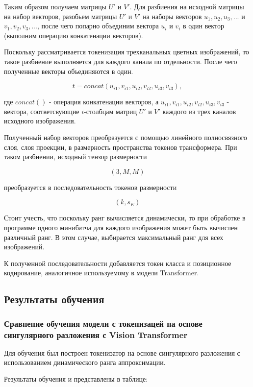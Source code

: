\documentclass[times,specification,annotation]{itmo-student-thesis}
\begin{document}
Таким образом получаем матрицы $U'$ и $V'$. Для разбиения на исходной матрицы на набор векторов, разобьем матрицы $U'$ и $V'$ на наборы векторов $u_1, u_2, u_3, ...$ и $v_1, v_2, v_3, ...$, после чего попарно объединим вектора $u_i$ и $v_i$ в один вектор (выполним операцию конкатенации векторов).

Поскольку рассматривается токенизация трехканальных цветных изображений, то такое разбиение выполняется для каждого канала по отдельности. После чего полученные векторы объединяются в один.

$$
t = concat(u_{i1}, v_{i1}, u_{i2}, v_{i2}, u_{i3}, v_{i3}),
$$

где $concat()$ - операция конкатенации векторов, а $u_{i1}, v_{i1}, u_{i2}, v_{i2}, u_{i3}, v_{i3}$ - вектора, соответсвующие $i$-столбцам матриц $U'$ и $V'$ каждого из трех каналов исходного изображения.

Полученный набор векторов преобразуется с помощью линейного полносвязного слоя, слоя проекции, в размерность пространства токенов трансформера. При таком разбиении, исходный тензор размерности

$$
(3, M, M)
$$

преобразуется в последовательность токенов размерности

$$
(k, s_E)
$$

Стоит учесть, что поскольку ранг вычисляется динамически, то при обработке в программе одного минибатча для каждого изображения может быть вычислен различный ранг. В этом случае, выбирается максимальный ранг для всех изображений.

К полученной последовательности добавляется токен класса и позиционное кодирование, аналогичное используемому в модели Transformer.

\subsection{Результаты обучения}

\subsubsection{Сравнение обучения модели с токенизацей на основе сингулярного разложения с Vision Transformer}

Для обучения был построен токенизатор на основе сингулярного разложения с использованием динамического ранга аппроксимации.

Результаты обучения и представлены в таблице:
\end{document}
